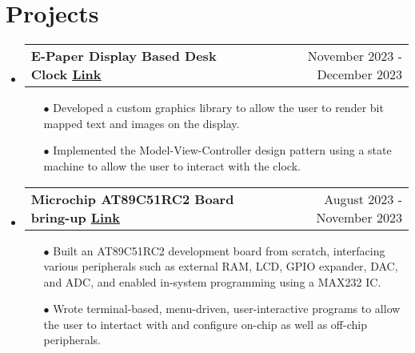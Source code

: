 \documentclass[11pt]{article}
\makeatletter
\newcommand{\resumeSubheadingP}[2]{
  \vspace{-2pt}\item
    \begin{tabular*}{1.0\textwidth}[t]{l@{\extracolsep{\fill}}r}
       \textbf{{\large #1}}&{#2} \\
    \end{tabular*}\vspace{-1pt}
}
\newcommand{\resumeSubHeadingListStart}{\begin{itemize}[leftmargin=0.0in, label={}]}
\newcommand{\resumeSubHeadingListEnd}{\end{itemize}}
\makeatother
\begin{document}
\section{Projects}
\resumeSubHeadingListStart
\resumeSubheadingP
{E-Paper Display Based Desk Clock \href{https://github.com/parthkharade/Eink-DeskClock}{\small{\textbar{ }\underline{Link} }}}{November 2023 - December 2023}
\begin{itemize}\setlength{\itemsep}{0pt}\setlength{\parskip}{0pt}\vspace{-0.2cm}
  \item[$\bullet$] Developed a custom graphics library  to allow the user to render bit mapped text and images on the display.
  \item[$\bullet$] Implemented the Model-View-Controller design pattern using a state machine to allow the user to interact with the clock.
\end{itemize}
\vspace{-0.3cm}
\resumeSubheadingP
{Microchip AT89C51RC2 Board bring-up \href{https://drive.google.com/drive/folders/1rbtfpOdMc_ohnfu15VS3bPxNDx-BoWwA?usp=drive_link}{\small{\textbar{ }\underline{Link}}}}{August 2023 - November 2023}
\begin{itemize}\setlength{\itemsep}{0pt}\setlength{\parskip}{0pt}\vspace{-0.2cm}
  \item[$\bullet$] Built an AT89C51RC2 development board from scratch, interfacing various peripherals such as external RAM, LCD, GPIO expander, DAC, and ADC, and enabled in-system programming using a MAX232 IC.
  \item[$\bullet$] Wrote terminal-based, menu-driven, user-interactive programs to allow the user to intertact with and configure on-chip as well as off-chip peripherals.
\end{itemize}
\vspace{-0.3cm}

\resumeSubHeadingListEnd
\vspace{-16pt}
\end{document}
